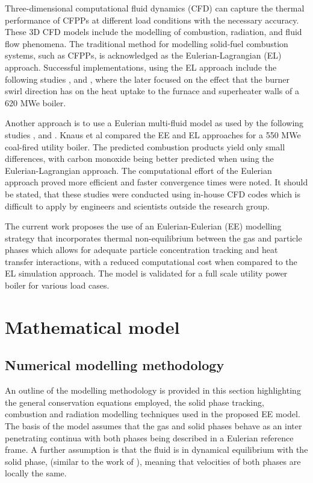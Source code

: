 \documentclass{webofc}
\begin{document}
Three-dimensional computational fluid dynamics (CFD) can capture the thermal performance of CFPPs at different load conditions with the necessary accuracy. These 3D CFD models include the modelling of combustion, radiation, and fluid flow phenomena. The traditional method for modelling
solid-fuel combustion systems, such as CFPPs, is acknowledged as the Eulerian-Lagrangian (EL) approach. Successful implementations, using the EL approach include the following studies \cite{bohnstein},\cite{laubscher_1} and \cite{laubscher_2}, where the later focused on the effect that the burner swirl direction has on the heat uptake to the furnace and superheater walls of a 620 MWe boiler.

Another approach is to use a Eulerian multi-fluid model as used by the following studies \cite{epple}, \cite{cai} and \cite{wu}. Knaus et al \cite{knaus} compared the EE and EL approaches for a 550 MWe coal-fired utility boiler. The predicted combustion products yield only small differences, with carbon monoxide being better predicted when using the Eulerian-Lagrangian approach. The computational effort of the Eulerian approach proved more efficient and faster convergence times were noted. It should be stated, that these studies were conducted using in-house CFD codes which is difficult to apply by engineers and scientists outside the research group.

The current work proposes the use of an Eulerian-Eulerian (EE) modelling strategy that incorporates thermal non-equilibrium between the gas and particle phases which allows for adequate particle concentration tracking and heat transfer interactions, with a reduced computational cost when compared to the EL simulation approach. The model is validated for a full scale utility power boiler for various load cases.

\section{Mathematical model} \label{Theory}
\subsection{Numerical modelling methodology}
An outline of the modelling methodology is provided in this section highlighting the general conservation equations employed, the solid phase tracking, combustion and radiation modelling techniques used in the proposed EE model. The basis of the model assumes that the gas and solid phases behave as an inter penetrating continua with both phases being described in a Eulerian reference frame. A further assumption is that the fluid is in dynamical equilibrium with the solid phase, (similar to the work of \cite{epple}), meaning that velocities of both phases are locally the same.
\end{document}
